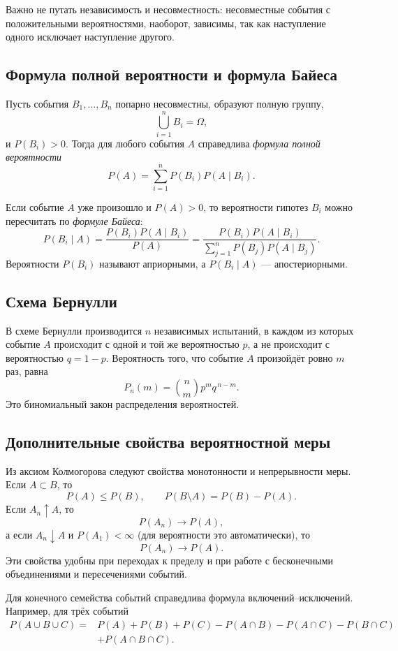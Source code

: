 Важно не путать независимость и несовместность: несовместные события с
положительными вероятностями, наоборот, зависимы, так как наступление одного
исключает наступление другого.

\subsection{Формула полной вероятности и формула Байеса}

Пусть события $B_1,\ldots,B_n$ попарно несовместны, образуют полную группу,
\[
    \bigcup_{i=1}^{n}B_i=\Omega,
\]
и $P(B_i)>0$. Тогда для любого события $A$ справедлива \emph{формула полной
вероятности}
\[
    P(A)=\sum_{i=1}^{n}P(B_i)P(A\mid B_i).
\]

Если событие $A$ уже произошло и $P(A)>0$, то вероятности гипотез $B_i$ можно пересчитать
по \emph{формуле Байеса}:
\[
    P(B_i\mid A)
    =\frac{P(B_i)P(A\mid B_i)}{P(A)}
    =\frac{P(B_i)P(A\mid B_i)}
    {\displaystyle\sum_{j=1}^{n}P(B_j)P(A\mid B_j)}.
\]
Вероятности $P(B_i)$ называют априорными, а $P(B_i\mid A)$ --- апостериорными.

\subsection{Схема Бернулли}

В схеме Бернулли производится $n$ независимых испытаний, в каждом из которых
событие $A$ происходит с одной и той же вероятностью $p$, а не происходит с
вероятностью $q=1-p$. Вероятность того, что событие $A$ произойдёт ровно $m$ раз,
равна
\[
    P_n(m)=\binom{n}{m}p^m q^{\,n-m}.
\]
Это биномиальный закон распределения вероятностей.


\subsection{Дополнительные свойства вероятностной меры}

Из аксиом Колмогорова следуют свойства монотонности и непрерывности меры. Если
$A\subset B$, то
\[
    P(A)\le P(B),\qquad P(B\setminus A)=P(B)-P(A).
\]
Если $A_n\uparrow A$, то
\[
    P(A_n)\to P(A),
\]
а если $A_n\downarrow A$ и $P(A_1)<\infty$ (для вероятности это автоматически), то
\[
    P(A_n)\to P(A).
\]
Эти свойства удобны при переходах к пределу и при работе с бесконечными
объединениями и пересечениями событий.

Для конечного семейства событий справедлива формула включений--исключений. Например,
для трёх событий
\[
\begin{aligned}
P(A\cup B\cup C)={}&P(A)+P(B)+P(C)
-P(A\cap B)-P(A\cap C)-P(B\cap C)\\
&+P(A\cap B\cap C).
\end{aligned}
\]

